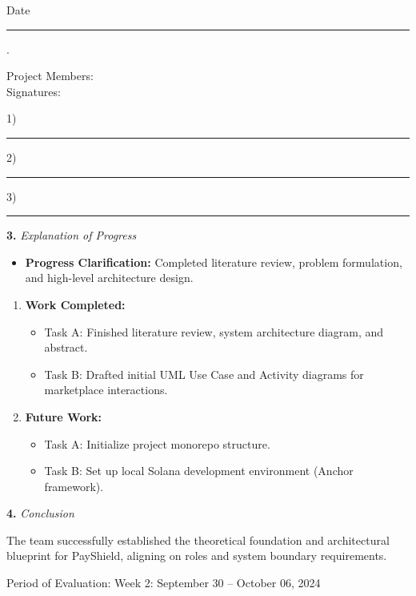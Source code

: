 \documentclass[12pt]{article}
\newcommand{\phasetitle}[1]{{\large Period of Evaluation: #1}\par\vspace{4pt}}
\newcommand{\subhead}[2]{\textbf{#1.} \textit{#2}\par}
\begin{document}
\vspace{20pt}
Date \rule{3cm}{0.4pt}.

\vspace{10pt}
Project Members:\\
Signatures: \quad 

\vspace{6pt}
\hspace*{2.2em}1) \rule{4cm}{0.4pt}

\vspace{6pt}
\hspace*{2.2em}2) \rule{4cm}{0.4pt}

\vspace{6pt}
\hspace*{2.2em}3) \rule{4cm}{0.4pt}

\newpage

\subhead{3}{Explanation of Progress}
\begin{itemize}[leftmargin=2em]
    \item \textbf{Progress Clarification:} Completed literature review, problem formulation, and high-level architecture design.
\end{itemize}

\begin{enumerate}[leftmargin=2em]
    \item \textbf{Work Completed:}
    \begin{itemize}[leftmargin=2em]
        \item Task A: Finished literature review, system architecture diagram, and abstract.
        \item Task B: Drafted initial UML Use Case and Activity diagrams for marketplace interactions.
    \end{itemize}
    \item \textbf{Future Work:}
    \begin{itemize}[leftmargin=2em]
        \item Task A: Initialize project monorepo structure.
        \item Task B: Set up local Solana development environment (Anchor framework).
    \end{itemize}
\end{enumerate}

\subhead{4}{Conclusion}
The team successfully established the theoretical foundation and architectural blueprint for PayShield, aligning on roles and system boundary requirements.

\newpage

\phasetitle{Week 2: September 30 -- October 06, 2024}
\end{document}
